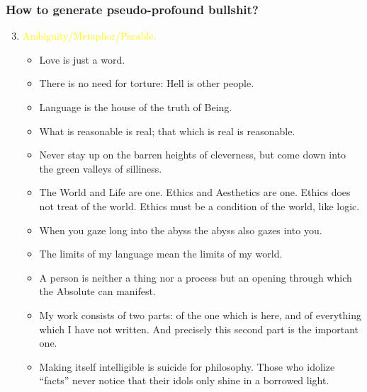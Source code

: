 \documentclass[UTF8,aspectratio=43,11pt,colorlinks,compress,openany]{beamer}%
\begin{document}
\begin{frame}\frametitle{How to generate pseudo-profound bullshit?}
	\begin{enumerate}\setcounter{enumi}{2}
		\item \textcolor{yellow}{Ambiguity/Metaphor/Parable.}
		\begin{itemize}
			\item Love is just a word.
			\item There is no need for torture: Hell is other people.
			\item Language is the house of the truth of Being.
			\item What is reasonable is real; that which is real is reasonable.
			\item Never stay up on the barren heights of cleverness, but come down into the green valleys of silliness.
			\item The World and Life are one. Ethics and Aesthetics are one. Ethics does not treat of the world. Ethics must be a condition of the world, like logic.
			\item When you gaze long into the abyss the abyss also gazes into you.
			\item The limits of my language mean the limits of my world.
			\item A person is neither a thing nor a process but an opening through which the Absolute can manifest.
			\item My work consists of two parts: of the one which is here, and of everything which I have not written. And precisely this second part is the important one.
			\item Making itself intelligible is suicide for philosophy. Those who idolize ``facts'' never notice that their idols only shine in a borrowed light.
		\end{itemize}
	\end{enumerate}
\end{frame}
\end{document}
